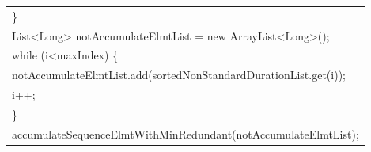 \documentclass[a4paper, 13pt]{report}
\begin{document}
\begin{enumerate}[label=\textbf{PL\arabic*}]
\begin{flushleft}
\begin{tabular}{ |l| }
\hspace{0.5cm} \}\\
\hspace{0.5cm} List<Long> notAccumulateElmtList = new ArrayList<Long>();\\
\hspace{0.5cm} while (i<maxIndex) \{\\
\hspace{1cm}      notAccumulateElmtList.add(sortedNonStandardDurationList.get(i));\\
\hspace{1cm}      i++;\\
\hspace{0.5cm} \}\\
\hspace{0.5cm} accumulateSequenceElmtWithMinRedundant(notAccumulateElmtList);\\
\hline
\end{tabular}
\end{flushleft}


\end{enumerate}
\end{document}
